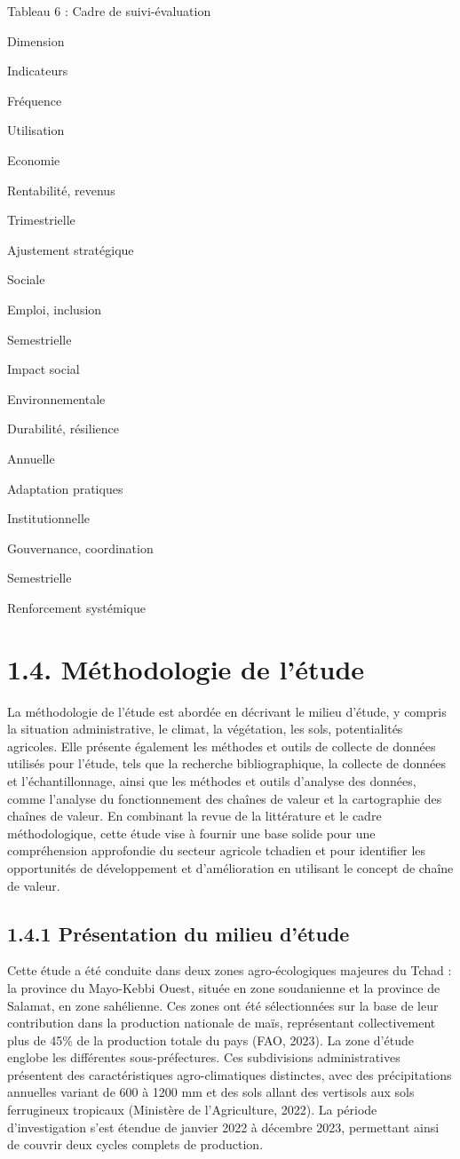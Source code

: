 \documentclass[12pt,oneside]{report}
\begin{document}
Tableau 6 : Cadre de suivi-évaluation

Dimension

Indicateurs

Fréquence

Utilisation

Economie

Rentabilité, revenus

Trimestrielle

Ajustement stratégique

Sociale

Emploi, inclusion

Semestrielle

Impact social

Environnementale

Durabilité, résilience

Annuelle

Adaptation pratiques

Institutionnelle

Gouvernance, coordination

Semestrielle

Renforcement systémique

\section{1.4. Méthodologie de l’étude}
La méthodologie de l'étude est abordée en décrivant le milieu d'étude, y compris la situation administrative, le climat, la végétation, les sols, potentialités agricoles. Elle présente également les méthodes et outils de collecte de données utilisés pour l'étude, tels que la recherche bibliographique, la collecte de données et l'échantillonnage, ainsi que les méthodes et outils d'analyse des données, comme l'analyse du fonctionnement des chaînes de valeur et la cartographie des chaînes de valeur. En combinant la revue de la littérature et le cadre méthodologique, cette étude vise à fournir une base solide pour une compréhension approfondie du secteur agricole tchadien et pour identifier les opportunités de développement et d'amélioration en utilisant le concept de chaîne de valeur.

\subsection{1.4.1 Présentation du milieu d’étude}
Cette étude a été conduite dans deux zones agro-écologiques majeures du Tchad : la province du Mayo-Kebbi Ouest, située en zone soudanienne et la province de Salamat, en zone sahélienne. Ces zones ont été sélectionnées sur la base de leur contribution dans la production nationale de maïs, représentant collectivement plus de 45\% de la production totale du pays (FAO, 2023). La zone d'étude englobe les différentes sous-préfectures. Ces subdivisions administratives présentent des caractéristiques agro-climatiques distinctes, avec des précipitations annuelles variant de 600 à 1200 mm et des sols allant des vertisols aux sols ferrugineux tropicaux (Ministère de l'Agriculture, 2022). La période d'investigation s'est étendue de janvier 2022 à décembre 2023, permettant ainsi de couvrir deux cycles complets de production.
\end{document}
